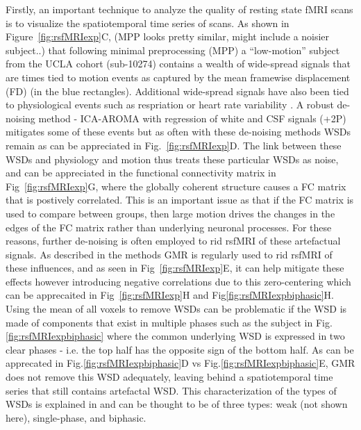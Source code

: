 \documentclass[oneside]{zHenriquesLab-StyleBioRxiv}
\begin{document}
Firstly, an important technique to analyze the quality of resting state fMRI scans is to visualize the spatiotemporal time series of scans. As shown in Figure~\ref{fig:rsfMRIexp}C, (MPP looks pretty similar, might include a noisier subject..) that following minimal preprocessing (MPP) a ``low-motion'' subject from the UCLA cohort (sub-10274) contains a wealth of wide-spread signals that are times tied to motion events as captured by the mean framewise displacement (FD) (in the blue rectangles). Additional wide-spread signals have also been tied to physiological events such as respriation \cite{power2017simple,power2018ridding} or heart rate variability \cite{birn2006separating}. A robust de-noising method - ICA-AROMA with regression of white and CSF signals (+2P) mitigates some of these events but as often with these de-noising methods WSDs remain \cite{power2018ridding,power2013steps} as can be appreciated in Fig.~\ref{fig:rsfMRIexp}D. The link between these WSDs and physiology and motion thus treats these particular WSDs as noise, and can be appreciated in the functional connectivity matrix in Fig~\ref{fig:rsfMRIexp}G, where the globally coherent structure causes a FC matrix that is postively correlated. This is an important issue as that if the FC matrix is used to compare between groups, then large motion drives the changes in the edges of the FC matrix rather than underlying neuronal processes. For these reasons, further de-noising is often employed to rid rsfMRI of these artefactual signals. As described in the methods GMR is regularly used to rid rsfMRI of these influences, and as seen in Fig~\ref{fig:rsfMRIexp}E, it can help mitigate these effects however introducing negative correlations due to this zero-centering \cite{murphy2009impact,saad2012-gsr-neg} which can be apprecaited in Fig~\ref{fig:rsfMRIexp}H and Fig\ref{fig:rsfMRIexpbiphasic}H. Using the mean of all voxels to remove WSDs can be problematic if the WSD is made of components that exist in multiple phases such as the subject in Fig.\ref{fig:rsfMRIexpbiphasic} where the common underlying WSD is expressed in two clear phases - i.e. the top half has the opposite sign of the bottom half. As can be apprecated in Fig.\ref{fig:rsfMRIexpbiphasic}D vs Fig.\ref{fig:rsfMRIexpbiphasic}E, GMR does not remove this WSD adequately, leaving behind a spatiotemporal time series that still contains artefactal WSD. This characterization of the types of WSDs is explained in \cite{aquino2019identifying} and can be thought to be of three types: weak (not shown here), single-phase, and biphasic. 
\end{document}
